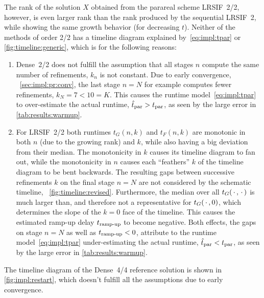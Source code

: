 The rank of the solution $X$ obtained from the parareal scheme \ac{LRSIF}~2/2, however,
is even larger rank than the rank produced by the sequential \ac{LRSIF}~2,
while showing the same growth behavior (for decreasing $t$).
Neither of the methods of order 2/2 has a timeline diagram explained by~\eqref{eq:impl:tpar} or \autoref{fig:timeline:generic},
which is for the following reasons:
\begin{enumerate}[resume]
  \item
    Dense~2/2 does not fulfill the assumption that all stages $n$ compute the same number of refinements,
    \ie $k_n$ is not constant.
    Due to early convergence, \cf~\autoref{sec:impl:pr:conv},
    the last stage $n=N$ for example computes fewer refinements, $k_N = 7 < 10 = K$.
    This causes the runtime model~\eqref{eq:impl:tpar} to over-estimate the actual runtime,
    $\hat t_\text{par} > t_\text{par}$,
    as seen by the large error in \autoref{tab:results:warmup}.
  \item
    For \ac{LRSIF}~2/2 both runtimes $t_G(n, k)$ and $t_F(n, k)$ are monotonic in both $n$ (due to the growing rank) and $k$,
    while also having a big deviation from their median.
    The monotonicity in $k$ causes its timeline diagram to fan out,
    while the monotonicity in $n$ causes each \enquote{feathers} $k$ of the timeline diagram to be bent backwards.
    The resulting gaps between successive refinements $k$ on the final stage $n=N$ are not considered
    by the schematic timeline, \cf~\autoref{fig:timeline:revised}.
    Furthermore, the median over all $t_G(\optional{},\optional{})$ is much larger than,
    and therefore not a representative for $t_G(\optional{}, 0)$,
    which determines the slope of the $k=0$ face of the timeline.
    This causes the estimated ramp-up delay $t_\text{ramp-up}$ to become negative.
    Both effects, the gaps on stage $n=N$ as well as $t_\text{ramp-up}<0$,
    attribute to the runtime model~\eqref{eq:impl:tpar} under-estimating the actual runtime,
    $\hat t_\text{par} < t_\text{par}$,
    as seen by the large error in \autoref{tab:results:warmup}.
\end{enumerate}
The timeline diagram of the Dense~4/4 reference solution is shown in \autoref{fig:impl:restart},
which doesn't fulfill all the assumptions due to early convergence.

